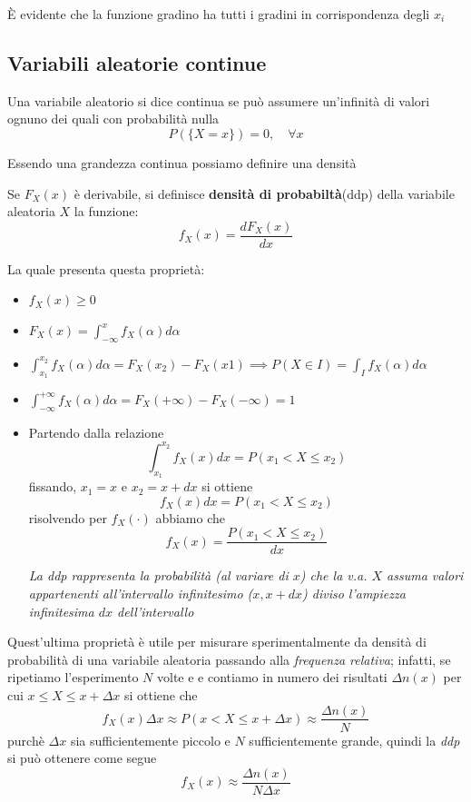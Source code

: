 È evidente che la funzione gradino ha tutti i gradini in corrispondenza degli $x_i$
\subsection{Variabili aleatorie continue}\label{sub:Variabili aleatorie continue} %
\begin{definition}\label{varabile aleatorio continua}
    Una variabile aleatorio si dice continua se può assumere un'infinità di valori
    ognuno dei quali con probabilità nulla
    \begin{displaymath}
        P(\{X = x\}) = 0, \quad \forall x 
    \end{displaymath}
    
\end{definition}
Essendo una grandezza continua possiamo definire una densità
\begin{definition}\label{densità di probabilità}
   Se $F_X(x)$ è derivabile, si definisce \textbf{densità di probabiltà}(ddp) della 
   variabile aleatoria $X$ la funzione: 
   \begin{displaymath}
       f_X(x) = \frac{dF_X(x)}{dx}
   \end{displaymath}
\end{definition}
La quale presenta questa proprietà:
\begin{itemize}
    \item $f_X(x) \geq 0$ 
    \item $F_X(x) = \int_{-\infty}^x  f_X(\alpha)d\alpha$
    \item $\int_{x_1}^{x_2}f_X(\alpha)d\alpha = F_X(x_2) - F_X(x1) \implies P(X \in I) = \int_I f_X(\alpha)d\alpha$ 
    \item $\int_{-\infty}^{+\infty} f_X(\alpha)d\alpha = F_X(+\infty) - F_X(-\infty) = 1$
    \item Partendo dalla relazione 
        \[
            \int_{x_1}^{x_2}f_X(x)dx = P(x_1 < X \leq x_2)
        \]
        fissando, $x_1=x$ e  $x_2 = x + dx$ si ottiene
        \[
            f_X(x)dx = P(x_1 < X \leq x_2)
        \]
        risolvendo per $f_X(\cdot)$ abbiamo che
        \[
            f_X(x) = \frac{P(x_1 < X \leq x_2)}{dx}
        \]
        \begin{importantbox}
        \textit{La ddp rappresenta la probabilità (al variare di $x$) che la v.a.
        $X$ assuma valori appartenenti all’intervallo infinitesimo ($x, x+dx$)
        diviso l’ampiezza infinitesima $dx$ dell’intervallo}
        \end{importantbox}
\end{itemize}
Quest'ultima proprietà è utile per misurare sperimentalmente da densità di probabilità di 
una variabile aleatoria passando alla \textit{frequenza relativa}; infatti, se ripetiamo l'esperimento
$N$ volte e e contiamo in numero dei risultati $\Delta n(x)$ per cui $x \leq X \leq x + \Delta x$ si ottiene che
\[
    f_X(x)\Delta x \approx P(x < X \leq x + \Delta x) \approx \frac{\Delta n(x)}{N}
\]
purchè $\Delta x$ sia sufficientemente piccolo e $N$ sufficientemente grande,
quindi la \textit{ddp} si può ottenere come segue
\[
    f_X(x) \approx \frac{\Delta n(x)}{N \Delta x} 
\]
